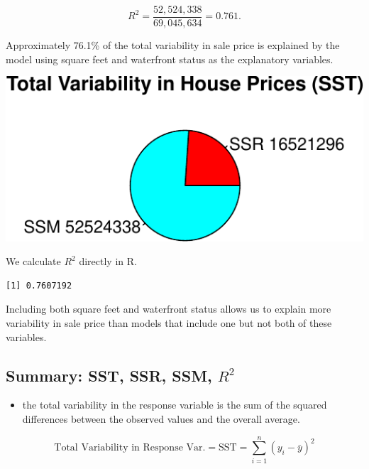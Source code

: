 \documentclass[
  letterpaper,
  DIV=11,
  numbers=noendperiod]{scrreprt}
\newenvironment{Shaded}{\begin{snugshade}}{\end{snugshade}}
\newcommand{\FunctionTok}[1]{\textcolor[rgb]{0.28,0.35,0.67}{#1}}
\newcommand{\NormalTok}[1]{\textcolor[rgb]{0.00,0.23,0.31}{#1}}
\newcommand{\SpecialCharTok}[1]{\textcolor[rgb]{0.37,0.37,0.37}{#1}}
\providecommand{\tightlist}{%
  \setlength{\itemsep}{0pt}\setlength{\parskip}{0pt}}\usepackage{longtable,booktabs,array}
\begin{document}
\[
R^2 = \frac{52,524,338}{69,045,634}=0.761.
\]

Approximately 76.1\% of the total variability in sale price is explained
by the model using square feet and waterfront status as the explanatory
variables.

\includegraphics{Ch2_files/figure-pdf/unnamed-chunk-40-1.pdf}

We calculate \(R^2\) directly in R.

\begin{Shaded}
\end{Shaded}

\begin{verbatim}
[1] 0.7607192
\end{verbatim}

Including both square feet and waterfront status allows us to explain
more variability in sale price than models that include one but not both
of these variables.

\subsection{\texorpdfstring{Summary: SST, SSR, SSM,
\(R^2\)}{Summary: SST, SSR, SSM, R\^{}2}}\label{summary-sst-ssr-ssm-r2}

\begin{itemize}
\tightlist
\item
  the total variability in the response variable is the sum of the
  squared differences between the observed values and the overall
  average.
\end{itemize}

\[\text{Total Variability in Response Var.}= \text{SST} =\displaystyle\sum_{i=1}^n(y_i-\bar{y})^2\]
\end{document}
